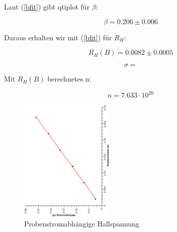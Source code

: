 \documentclass[12pt,a4paper,twopage]{article}
\begin{document}
Laut (\ref{bfit}) gibt qtiplot für $\beta$:

$$ \beta =  0.206 \pm 0.006 $$

Daraus erhalten wir mit (\ref{bfit}) für $R_H$:

\begin{center}
$$ \boxed{ R_H(B) = 0.0082 \pm 0.0005 } $$
\end{center}

$$ \sigma = $$

Mit $R_H(B)$ berechnetes n: 

$$ n = 7.633 \cdot 10^20 $$

\pagebreak

\begin{figure}[H]
\begin{center}
\includegraphics[width=0.4\textwidth, angle=-90]{probenstrom.eps}
\caption{Probenstromabhängige Hallspannung}
\end{center}
\end{figure}
\end{document}
